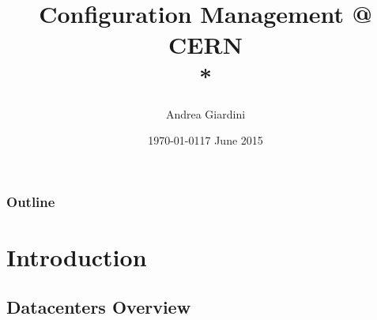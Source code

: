 \documentclass[aspectratio=169]{beamer}
\title[Configuration Management @ CERN]{Configuration Management @ CERN\\*
    }
\author{Andrea Giardini}
\date{\today}
\institute[CERN]
{
CERN \\
\medskip
\textit{andrea.giardini@cern.ch}
}
\date{17 June 2015}
\begin{document}
\begin{frame}
\titlepage
\end{frame}

\begin{frame}
\frametitle{Outline}
\tableofcontents
\end{frame}


\section{Introduction}

\subsection{Datacenters Overview}
\end{document}

